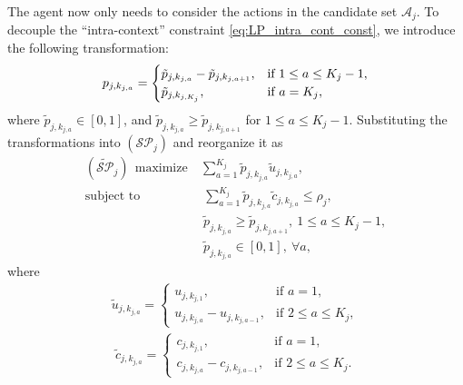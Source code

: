 The agent now only needs to consider the actions in the candidate set $\mathcal{A}_j$. To decouple the ``intra-context'' constraint \eqref{eq:LP_intra_cont_const}, we introduce the following transformation:
\begin{eqnarray}
p_{j, k_{j,a}} =
\begin{cases}
\tilde{p}_{j, k_{j,a}} - \tilde{p}_{j, k_{j, a+1}},&\text{if $ 1 \leq a \leq K_j - 1$},\\
\tilde{p}_{j, k_{j, K_j}}, &\text{if $a = K_j$},
\end{cases}\nonumber
\end{eqnarray}
where $\tilde{p}_{j, k_{j,a}} \in [0, 1]$, and $\tilde{p}_{j, k_{j,a}} \geq \tilde{p}_{j, k_{j, a+1}}$ for $ 1 \leq a \leq K_j - 1$.
Substituting the transformations into $({\mathcal{SP}}_j)$ and reorganize it as
\begin{align}
(\widetilde{\mathcal{SP}}_j)~~ \text{maximize} &~ \sum_{a = 1}^{K_j} \tilde{p}_{j,k_{j,a}} \tilde{u}_{j,k_{j,a}}, \nonumber \\
\text{subject to} &~~ \sum_{a = 1}^{K_j} \tilde{p}_{j,k_{j,a}} \tilde{c}_{j,k_{j, a}} \leq \rho_j, \nonumber \\
&~~ \tilde{p}_{j, k_{j,a}} \geq \tilde{p}_{j, k_{j, a+1}}, ~1 \leq a \leq K_j - 1, \label{eq:virtual_lp_ineff}\\
&~~ \tilde{p}_{j,k_{j,a}} \in [0,1], ~\forall a,\nonumber
\end{align}
where
\begin{eqnarray}
\tilde{u}_{j,k_{j,a}} =
\begin{cases}
u_{j, k_{j,1}},&\text{if $a = 1$},\\
u_{j, k_{j,a}} - u_{j, k_{j, a-1}}, &\text{if $2 \leq a \leq K_j$},
\end{cases}\nonumber
\end{eqnarray}
\begin{eqnarray}
\tilde{c}_{j,k_{j, a}} =
\begin{cases}
c_{j, k_{j, 1}},&\text{if $a = 1$},\\
c_{j, k_{j, a}} - c_{j, k_{j, a-1}}, &\text{if $2 \leq a \leq K_j$}.
\end{cases}\nonumber
\end{eqnarray}

